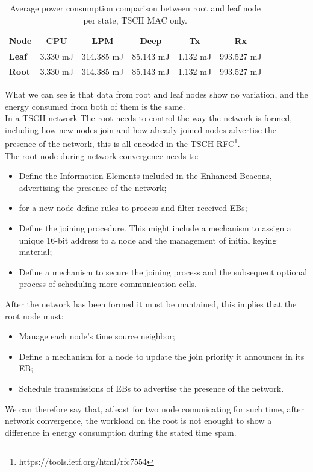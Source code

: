 \documentclass[conference]{IEEEtran}
\renewcommand\_{\textunderscore\allowbreak}
\begin{document}
\begin{table}[htbp]
	\centering
	\begin{tabular}{llllll}
		\hline
		\textbf{Node} & \multicolumn{1}{c}{\textbf{CPU}} & \multicolumn{1}{c}{\textbf{LPM}} & \multicolumn{1}{c}{\textbf{Deep}} & \multicolumn{1}{c}{\textbf{Tx}} & \multicolumn{1}{c}{\textbf{Rx}} \\ \hline
		\textbf{Leaf} & 3.330 mJ                         & 314.385 mJ                       & 85.143 mJ                         & 1.132 mJ                        & 993.527 mJ                      \\
		\textbf{Root} & 3.330 mJ                         & 314.385 mJ                       & 85.143 mJ                         & 1.132 mJ                        & 993.527 mJ                      \\ \hline
	\end{tabular}
	\caption{Average power consumption comparison between root and leaf node per state, TSCH MAC only.}
	\label{tab:MACOnly}
\end{table}
What we can see is that data from root and leaf nodes show no variation, and the energy consumed from both of them is the same.\\
In a TSCH network The root needs to control the way the network is formed, including how new nodes join and how already joined nodes advertise the presence of the network, this is all encoded in the TSCH RFC\footnote{https://tools.ietf.org/html/rfc7554}.\\
The root node during network convergence needs to:
\begin{itemize}
	\item Define the Information Elements included in the Enhanced Beacons, advertising the presence of the network;
	\item for a new node define rules to process and filter received EBs;
	\item Define the joining procedure.  This might include a mechanism to assign a unique 16-bit address to a node and the management of initial keying material;
	\item Define a mechanism to secure the joining process and the subsequent optional process of scheduling more communication cells.
\end{itemize}
After the network has been formed it must be mantained, this implies that the root node must:
\begin{itemize}
	\item Manage each node's time source neighbor;
	\item Define a mechanism for a node to update the join priority it announces in its EB;
	\item Schedule transmissions of EBs to advertise the presence of the network.
\end{itemize}
We can therefore say that, atleast for two node comunicating for such time, after network convergence, the workload on the root is not enought to show a difference in energy consumption during the stated time spam.
\end{document}
